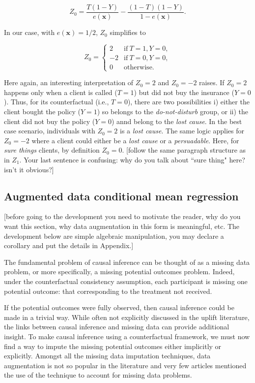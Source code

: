 \documentclass{article}
\def\x{\mathbf x}
\def \vahid {\color{magenta}}
\begin{document}
\begin{equation}
    Z_0 =  \frac{T (1-Y)}{e(\x)} - \frac{(1-T)(1-Y)}{1-e(\x)}.
    \label{eq:transformed_outcome_w}
\end{equation}

In our case, with $e(\x) = 1/2$, $Z_0$ simplifies to

\[ Z_0 = 
    \left\{ \begin{array}{cc}
      2 & \mathrm{if}~T=1, Y=0, \\
      -2 & \mathrm{if}~T=0, Y=0, \\
      0 & \mathrm{otherwise.} 
            \end{array} \right.
\]

Here again, an interesting interpretation of $Z_0=2$ and $Z_0=-2$ raises. If $Z_0=2$happens only when a client is called ($T = 1$) but did not buy the insurance ($Y = 0$). Thus, for its counterfactual (i.e., $T = 0$), there are two possibilities  i) either the client bought the policy ($Y = 1$) so belongs to the  \textit{do-not-disturb} group, or ii) the client did not buy the policy ($Y = 0$) annd belong to the \textit{lost cause}. In the best case scenario, individuals with $Z_0 = 2$ is a \textit{lost cause}. The same logic applies for $Z_0 = -2$ where a client could either be a \textit{lost cause} or a \textit{persuadable}. Here, for \textit{sure things} clients, by definition $Z_0 = 0$. {\vahid [follow the same paragraph structure as in $Z_1$. Your last sentence is confusing: why do you talk about ``sure thing" here? isn't it obvious?]}

\subsection{Augmented data conditional mean regression} 
\label{sec:smite_ie}
{\vahid [before going to the development you need to motivate the reader, why do you want this section, why data augmentation in this form is meaningful, etc. The development below are simple algebraic manipulation, you may declare a corollary and put the details in Appendix.]}



The fundamental problem of causal inference can be thought of as a missing data problem, or more specifically, a missing potential outcomes problem. Indeed, under the counterfactual consistency assumption, each participant is missing one potential outcome: that corresponding to the treatment not received.

If the potential outcomes were fully observed, then causal inference could be made in a trivial way. While often not explicitly discussed in the uplift literature, the links between causal inference and missing data can provide additional insight.
%
To make causal inference using a counterfactual framework, we must now find a way to impute the missing potential outcomes either implicitly or explicitly.
%
Amongst all the missing data imputation techniques, data augmentation is not so popular in the literature and very few articles mentioned the use of the technique to account for missing data problems. 
\end{document}
